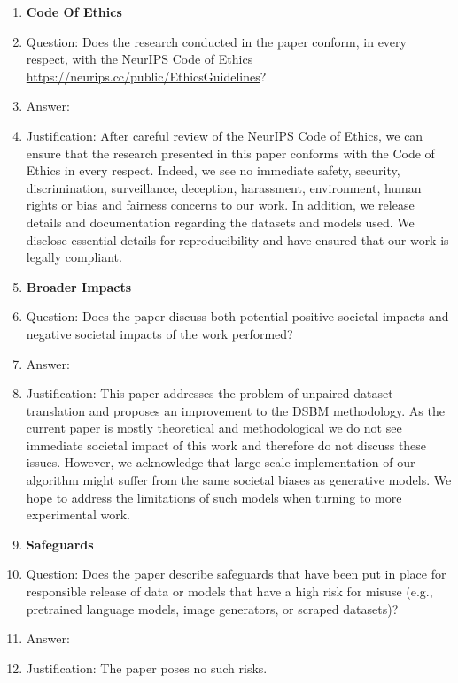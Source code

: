 \documentclass{article}
\begin{document}
\begin{enumerate}
    
\item {\bf Code Of Ethics}
    \item[] Question: Does the research conducted in the paper conform, in every respect, with the NeurIPS Code of Ethics \url{https://neurips.cc/public/EthicsGuidelines}?
    \item[] Answer: \answerYes{} %
    \item[] Justification: After careful review of the NeurIPS Code of Ethics, we can ensure that the research presented in this paper conforms with the Code of Ethics in every respect. Indeed, we see no immediate safety, security, discrimination, surveillance, deception, harassment, environment, human rights or bias and fairness concerns to our work. In addition, we release details and documentation regarding the datasets and models used. We disclose essential details for reproducibility and have ensured that our work is legally compliant. 



\item {\bf Broader Impacts}
    \item[] Question: Does the paper discuss both potential positive societal impacts and negative societal impacts of the work performed?
    \item[] Answer: \answerNA{} %
    \item[] Justification: This paper addresses the problem of unpaired dataset translation and proposes an improvement to the DSBM methodology. As the current paper is mostly theoretical and methodological we do not see immediate societal impact of this work and therefore do not discuss these issues. However, we acknowledge that large scale implementation of our algorithm might suffer from the same societal biases as generative models. We hope to address the limitations of such models when turning to more experimental work.

    
\item {\bf Safeguards}
    \item[] Question: Does the paper describe safeguards that have been put in place for responsible release of data or models that have a high risk for misuse (e.g., pretrained language models, image generators, or scraped datasets)?
    \item[] Answer: \answerNA{} %
    \item[] Justification: The paper poses no such risks.



\end{enumerate}
\end{document}
